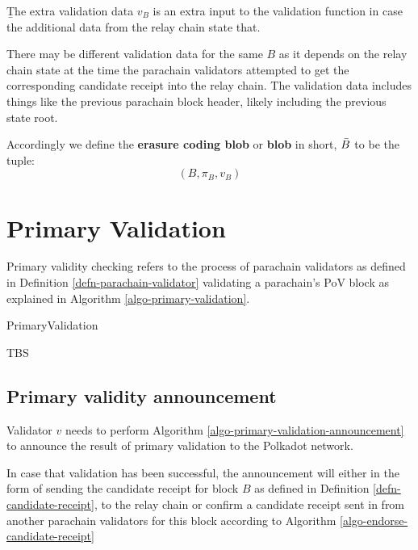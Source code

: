 \begin{definition}  \label{defn-extra-validation-data}
  {\b The extra validation data} $v_B$  is an extra input to the validation function in case the additional data from the relay chain state that.
\end{definition}

There may be different validation data for the same $B$ as it depends on the relay chain state at the time the parachain validators attempted to get the corresponding candidate receipt into the relay chain. The validation data includes things like the previous parachain block header, likely including the previous state root.

\begin{definition}
  \label{defn-blob}
  Accordingly we define the {\bf erasure coding blob} or {\bf blob} in short, {\bf $\bar{B}$} to be the tuple:
  \[
  (B, \pi_B, v_B)
  \]
\end{definition}

\section{Primary Validation}
\label{sect-primary-validation}

Primary validity checking refers to the process of parachain validators as defined in Definition \ref{defn-parachain-validator} validating a parachain's PoV block as explained in Algorithm \ref{algo-primary-validation}.

\begin{algorithm}
  \caption[]{\sc PrimaryValidation}
  \label{algo-primary-validation}
  \begin{algorithmic}[1]
    \Require{}
    
    \State TBS
  \end{algorithmic}
\end{algorithm}

\subsection{Primary validity announcement}
\label{sect-primary-validaty-announcement}
Validator $v$ needs to perform Algorithm \ref{algo-primary-validation-announcement} to announce the result of primary validation to the Polkadot network.

In case that validation has been successful, the announcement will either in the form of sending the candidate receipt for block $B$ as defined in Definition \ref{defn-candidate-receipt}, to the relay chain or confirm a candidate receipt sent in from another parachain validators for this block according to Algorithm \ref{algo-endorse-candidate-receipt}

